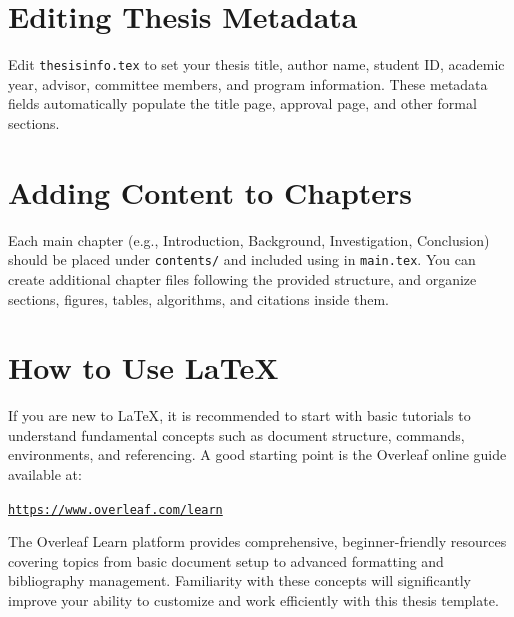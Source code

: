 \section{Editing Thesis Metadata}
\begin{paragraph}
Edit \texttt{thesisinfo.tex} to set your thesis title, author name, student ID, academic year, advisor, committee members, and program information. These metadata fields automatically populate the title page, approval page, and other formal sections.
\end{paragraph}

\section{Adding Content to Chapters}
\begin{paragraph}
Each main chapter (e.g., Introduction, Background, Investigation, Conclusion) should be placed under \texttt{contents/} and included using \verb|| in \texttt{main.tex}. You can create additional chapter files following the provided structure, and organize sections, figures, tables, algorithms, and citations inside them.
\end{paragraph}

\section{How to Use {\LaTeX}}
\begin{paragraph}
If you are new to {\LaTeX}, it is recommended to start with basic tutorials to understand fundamental concepts such as document structure, commands, environments, and referencing. A good starting point is the Overleaf online guide available at:

\begin{center}
\href{https://www.overleaf.com/learn}{\texttt{https://www.overleaf.com/learn}}
\end{center}

The Overleaf Learn platform provides comprehensive, beginner-friendly resources covering topics from basic document setup to advanced formatting and bibliography management. Familiarity with these concepts will significantly improve your ability to customize and work efficiently with this thesis template.
\end{paragraph}

